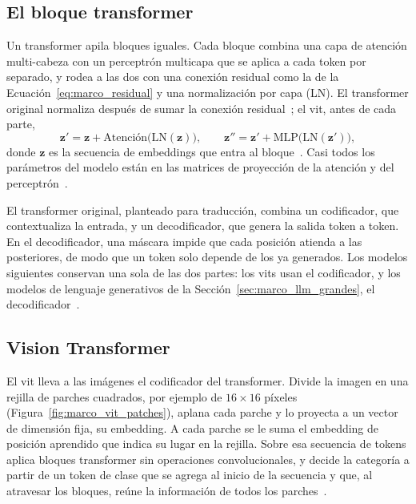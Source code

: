 \subsection{El bloque transformer}
\label{sec:marco_bloque_transformer}

Un transformer apila bloques iguales. Cada bloque combina una capa de atención multi-cabeza con un perceptrón
multicapa que se aplica a cada token por separado, y rodea a las dos con una conexión residual como la de la
Ecuación~\ref{eq:marco_residual} y una normalización por capa (LN). El transformer original normaliza después
de sumar la conexión residual~\cite{vaswani2017attention}; el \gls{vit}, antes de cada parte,
\begin{equation}
    \mathbf{z}' = \mathbf{z} + \mathrm{Atención}\bigl(\mathrm{LN}(\mathbf{z})\bigr), \qquad
    \mathbf{z}'' = \mathbf{z}' + \mathrm{MLP}\bigl(\mathrm{LN}(\mathbf{z}')\bigr),
    \label{eq:marco_bloque}
\end{equation}
donde $\mathbf{z}$ es la secuencia de embeddings que entra al bloque~\cite{dosovitskiy2021image}. Casi todos
los parámetros del modelo están en las matrices de proyección de la atención y del perceptrón~\cite{kaplan2020scaling}.

El transformer original, planteado para traducción, combina un codificador, que contextualiza la entrada, y un
decodificador, que genera la salida token a token. En el decodificador, una máscara impide que cada posición
atienda a las posteriores, de modo que un token solo depende de los ya generados. Los modelos siguientes
conservan una sola de las dos partes: los \glspl{vit} usan el codificador, y los modelos de lenguaje
generativos de la Sección~\ref{sec:marco_llm_grandes}, el
decodificador~\cite{vaswani2017attention,dosovitskiy2021image,brown2020language}.

\subsection{Vision Transformer}
\label{sec:marco_vit}

El \gls{vit} lleva a las imágenes el codificador del transformer. Divide la imagen en una rejilla de parches
cuadrados, por ejemplo de $16 \times 16$ píxeles (Figura~\ref{fig:marco_vit_patches}), aplana cada parche y lo proyecta a un vector de dimensión
fija, su embedding. A cada parche se le suma el embedding de posición aprendido que indica su lugar en la
rejilla. Sobre esa secuencia de tokens aplica bloques transformer sin operaciones convolucionales, y decide la
categoría a partir de un token de clase que se agrega al inicio de la secuencia y que, al atravesar los bloques,
reúne la información de todos los parches~\cite{dosovitskiy2021image}.

